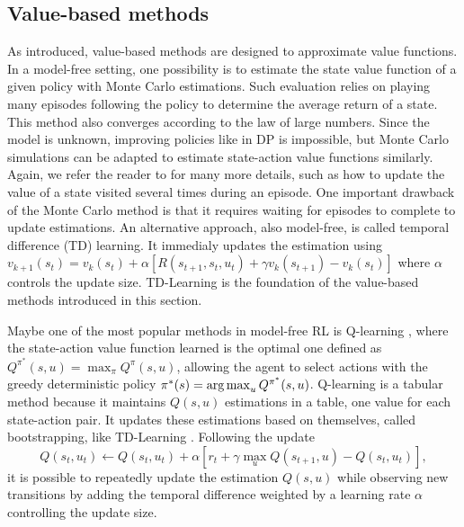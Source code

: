 \subsection{Value-based methods} \label{sec:ch2_value_based_methods}
As introduced, value-based methods are designed to approximate value functions.
In a model-free setting, one possibility is to estimate the state value function of a given policy with Monte Carlo estimations.
Such evaluation relies on playing many episodes following the policy to determine the average return of a state.
This method also converges according to the law of large numbers.
Since the model is unknown, improving policies like in DP is impossible, but Monte Carlo simulations can be adapted to estimate state-action value functions similarly.
Again, we refer the reader to \citep{sutton2018reinforcement} for many more details, such as how to update the value of a state visited several times during an episode.
One important drawback of the Monte Carlo method is that it requires waiting for episodes to complete to update estimations.
An alternative approach, also model-free, is called temporal difference (TD) learning.
It immedialy updates the estimation using $v_{k+1}(s_t) = v_k(s_t) + \alpha [R(s_{t+1}, s_t, u_t) + \gamma v_k(s_{t+1}) - v_k(s_t)]$ where $\alpha$ controls the update size.
TD-Learning is the foundation of the value-based methods introduced in this section.

Maybe one of the most popular methods in model-free RL is Q-learning \citep{watkins1992q}, where the state-action value function learned is the optimal one defined as $Q^{\pi^*}(s, u)=\max_{\pi}Q^\pi(s, u)$, allowing the agent to select actions with the greedy deterministic policy $\pi^*(s)=\operatorname*{arg\,max}_u Q^{\pi^*}(s, u)$.
Q-learning is a tabular method because it maintains $Q(s, u)$ estimations in a table, one value for each state-action pair.
It updates these estimations based on themselves, called bootstrapping, like TD-Learning \citep{sutton2018reinforcement}.
Following the update 
\begin{equation}
\label{eq:ch2_QLearning}
    Q(s_t, u_t) \leftarrow Q(s_t, u_t) + \alpha \left[ r_t + \gamma \max_u Q(s_{t+1}, u) - Q(s_t, u_t) \right],
\end{equation}
it is possible to repeatedly update the estimation $Q(s, u)$ while observing new transitions by adding the temporal difference weighted by a learning rate $\alpha$ controlling the update size.

